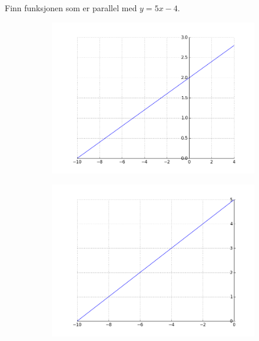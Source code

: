 \documentclass[12pt,twoside,onecolumn]{article}
\begin{document}
\begin{Exercise}
\label{ex:12}
Finn funksjonen som er parallel med $y = 5x - 4$.
\newline
\begin{figure}[h!]
    \centering
    \begin{subfigure}{.5\textwidth}
    \centering
    \includegraphics[scale = 0.4]{figures/xd5p2.png}
    \end{subfigure}%
    \begin{subfigure}{.5\textwidth}
    \centering
    \includegraphics[scale = 0.4]{figures/xd2p5.png}

\end{subfigure}
\end{figure}
\end{Exercise}
\end{document}
